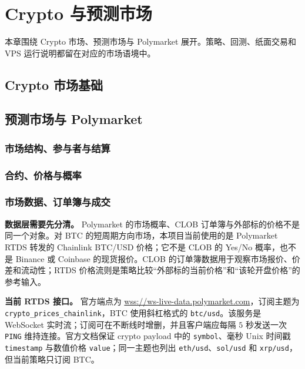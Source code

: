 \chapter{Crypto 与预测市场}

本章围绕 Crypto 市场、预测市场与 Polymarket 展开。策略、回测、纸面交易和 VPS 运行说明都留在对应的市场语境中。


\section{Crypto 市场基础}


\section{预测市场与 Polymarket}

\subsection{市场结构、参与者与结算}

\subsection{合约、价格与概率}

\subsection{市场数据、订单簿与成交}

\label{sec:polymarket-rtds-data}

\textbf{数据层需要先分清。} Polymarket 的市场概率、CLOB 订单簿与外部标的价格不是同一个对象。对 BTC 的短周期方向市场，本项目当前使用的是 Polymarket RTDS 转发的 Chainlink BTC/USD 价格；它不是 CLOB 的 Yes/No 概率，也不是 Binance 或 Coinbase 的现货报价。CLOB 的订单簿数据用于观察市场报价、价差和流动性；RTDS 价格流则是策略比较“外部标的当前价格”和“该轮开盘价格”的参考输入。

\textbf{当前 RTDS 接口。} 官方端点为 \url{wss://ws-live-data.polymarket.com}，订阅主题为 \texttt{crypto\_prices\_chainlink}，BTC 使用斜杠格式的 \texttt{btc/usd}。该服务是 WebSocket 实时流；订阅可在不断线时增删，并且客户端应每隔 \(5\) 秒发送一次 \texttt{PING} 维持连接。官方文档保证 crypto payload 中的 \texttt{symbol}、毫秒 Unix 时间戳 \texttt{timestamp} 与数值价格 \texttt{value}；同一主题也列出 \texttt{eth/usd}、\texttt{sol/usd} 和 \texttt{xrp/usd}，但当前策略只订阅 BTC。

